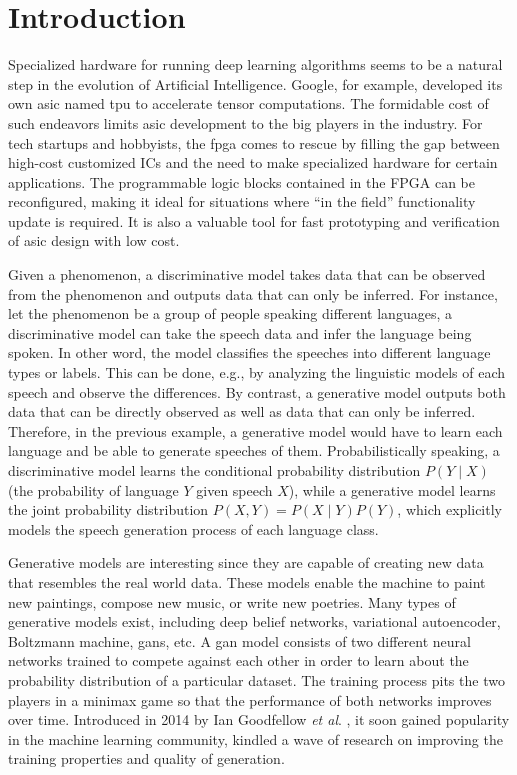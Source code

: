 
\chapter{Introduction}

Specialized hardware for running deep learning algorithms seems to be a natural step in the evolution of
Artificial Intelligence.  Google, for example, developed its own \gls{asic} named \gls{tpu}
to accelerate tensor computations. The formidable cost of such endeavors limits \gls{asic} development to
the big players in the industry. For tech startups and hobbyists, the \gls{fpga} comes to rescue by filling
the gap between high-cost customized ICs and the need to make specialized hardware for certain
applications. The programmable logic blocks contained in the FPGA can be reconfigured, making it ideal for
situations where "`in the field"' functionality update is required. It is also a valuable tool for fast
prototyping and verification of \gls{asic} design with low cost.

Given a phenomenon, a discriminative model takes data that can be observed from the phenomenon and outputs
data that can only be inferred. For instance, let the phenomenon be a group of people speaking different
languages, a discriminative model can take the speech data and infer the language being spoken. In other
word, the model classifies the speeches into different language types or labels. This can be done, e.g.,
by analyzing the linguistic models of each speech and observe the differences. By contrast, a generative
model outputs both data that can be directly observed as well as data that can only be inferred. Therefore,
in the previous example, a generative model would have to learn each language and be able to generate
speeches of them. Probabilistically speaking, a discriminative model learns the conditional probability
distribution $P(Y \mid X)$ (the probability of language $Y$ given speech $X$), while a generative model
learns the joint probability distribution $P(X,Y) = P(X \mid Y)P(Y)$, which explicitly models the speech
generation process of each language class.

Generative models are interesting since they are capable of creating new data that resembles the real world
data. These models enable the machine to paint new paintings, compose new music, or write new poetries.
Many types of generative models exist, including deep belief networks, variational autoencoder,
Boltzmann machine, \gls{gan}s, etc. A \gls{gan} model consists of two different neural networks trained to
compete against each other in order to learn about the probability distribution of a particular dataset.
The training process pits the two players in a minimax game so that the performance of both networks improves
over time. Introduced in 2014 by Ian Goodfellow \textit{et al}. \cite{goodfellow:gan}, it soon gained
popularity in the machine learning community, kindled a wave of research on improving the training properties
and quality of generation.

